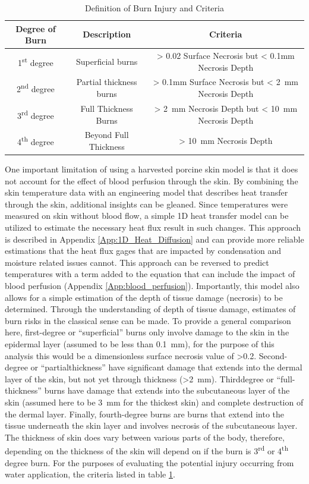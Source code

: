 \documentclass[12pt,oneside]{book}
\begin{document}
\begin{table} [H]
\caption{Definition of Burn Injury and Criteria}
\label{tab:Burn_Inj_Criteria}
\begin{tabular}{|c|c|c|}
\hline
Degree of Burn 					& Description				& Criteria 												\\ \hline \hline
1\textsuperscript{st} degree 	& Superficial burns			& > 0.02 Surface Necrosis but < 0.1mm Necrosis Depth	\\ \hline
2\textsuperscript{nd} degree 	& Partial thickness burns 	& > 0.1mm Surface Necrosis but < 2~mm Necrosis Depth 	\\ \hline
3\textsuperscript{rd} degree 	& Full Thickness Burns		& > 2~mm Necrosis Depth but < 10~mm Necrosis Depth 		\\ \hline
4\textsuperscript{th} degree 	& Beyond Full Thickness		& > 10~mm Necrosis Depth 								\\ \hline
\end{tabular}
\end{table}

One important limitation of using a harvested porcine skin model is that it does not account for the effect of blood perfusion through the skin. By combining the skin temperature data with an engineering model that describes heat transfer through the skin, additional insights can be gleaned.  Since temperatures were measured on skin without blood flow, a simple 1\-D heat transfer model can be utilized to estimate the necessary heat flux result in such changes.  This approach is described in Appendix \ref{App:1D_Heat_Diffusion} and can provide more reliable estimations that the heat flux gages that are impacted by condensation and moisture related issues cannot.  This approach can be reversed to predict temperatures with a term added to the equation that can include the impact of blood perfusion (Appendix \ref{App:blood_perfusion}).  Importantly, this model also allows for a simple estimation of the depth of tissue damage (necrosis) to be determined.  Through the understanding of depth of tissue damage, estimates of burn risks in the classical sense can be made. To provide a general comparison here, first-degree or ``superficial'' burns only involve damage to the skin in the epidermal layer (assumed to be less than 0.1~mm), for the purpose of this analysis this would be a dimensionless surface necrosis value of \textgreater 0.2. Second-degree or ``partial\-thickness'' have significant damage that extends into the dermal layer of the skin, but not yet through thickness (\textgreater 2~mm). Third\-degree or ``full-thickness'' burns have damage that extends into the subcutaneous layer of the skin (assumed here to be 3~mm for the thickest skin) and complete destruction of the dermal layer. Finally, fourth-degree burns are burns that extend into the tissue underneath the skin layer and involves necrosis of the subcutaneous layer. The thickness of skin does vary between various parts of the body, therefore, depending on the thickness of the skin will depend on if the burn is 3\textsuperscript{rd} or 4\textsuperscript{th} degree burn. For the purposes of evaluating the potential injury occurring from water application, the criteria listed in table \ref{tab:Burn_Inj_Criteria}.  
\end{document}
